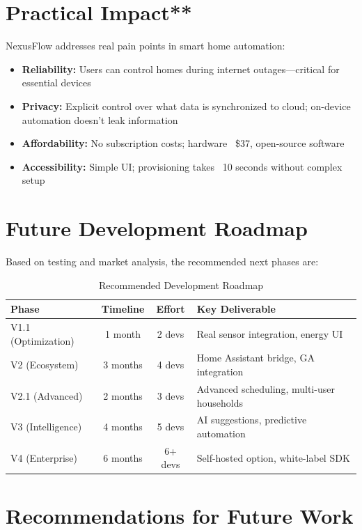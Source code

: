 \section{Practical Impact**}

NexusFlow addresses real pain points in smart home automation:

\begin{itemize}
    \item \textbf{Reliability:} Users can control homes during internet outages—critical for essential devices
    \item \textbf{Privacy:} Explicit control over what data is synchronized to cloud; on-device automation doesn't leak information
    \item \textbf{Affordability:} No subscription costs; hardware ~\$37, open-source software
    \item \textbf{Accessibility:} Simple UI; provisioning takes ~10 seconds without complex setup
\end{itemize}

\section{Future Development Roadmap}

Based on testing and market analysis, the recommended next phases are:

\begin{table}[H]
\centering
\caption{Recommended Development Roadmap}
\label{tbl:roadmap}
\begin{tabular}{|l|c|c|l|}
\hline
\textbf{Phase} & \textbf{Timeline} & \textbf{Effort} & \textbf{Key Deliverable} \\
\hline
V1.1 (Optimization) & 1 month & 2 devs & Real sensor integration, energy UI \\
\hline
V2 (Ecosystem) & 3 months & 4 devs & Home Assistant bridge, GA integration \\
\hline
V2.1 (Advanced) & 2 months & 3 devs & Advanced scheduling, multi-user households \\
\hline
V3 (Intelligence) & 4 months & 5 devs & AI suggestions, predictive automation \\
\hline
V4 (Enterprise) & 6 months & 6+ devs & Self-hosted option, white-label SDK \\
\hline
\end{tabular}
\end{table}

\section{Recommendations for Future Work}

